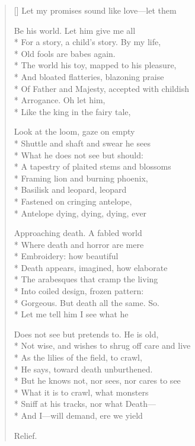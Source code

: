 \label{ch:lear_ad}
\settowidth{\versewidth}{Not wise, and wishes to shrug off care and live}
\begin{verse}[\versewidth]
Let my promises sound like love---let them

Be his world.  Let him give me all\\*
For a story, a child's story.    By my life,\\*
Old fools are babes again.\\*
The world his toy, mapped to his pleasure,\\*
And bloated flatteries, blazoning praise\\*
Of Father and Majesty, accepted with childish\\*
Arrogance.  Oh let him,\\*
Like the king in the fairy tale,

Look at the loom, gaze on empty\\*
Shuttle and shaft and swear he sees\\*
What he does not see but should:\\*
A tapestry of plaited stems and blossoms\\*
Framing lion and burning phoenix,\\*
Basilisk and leopard, leopard\\*
Fastened on cringing antelope,\\*
Antelope dying, dying, dying, ever

Approaching death.    A fabled world\\*
Where death and horror are mere\\*
Embroidery: how beautiful\\*
Death appears, imagined, how elaborate\\*
The arabesques that cramp the living\\*
Into coiled design, frozen pattern:\\*
Gorgeous. But death all the same. So.\\*
Let me tell him I see what he

Does not see but pretends to.  He is old,\\*
Not wise, and wishes to shrug off care and live\\*
As the lilies of the field, to crawl,\\*
He says, toward death unburthened.\\*
But he knows not, nor sees, nor cares to see\\*
What it is to crawl, what monsters\\*
Sniff at his tracks, nor what Death---\\*
And I---will demand, ere we yield

Relief.
\end{verse}
